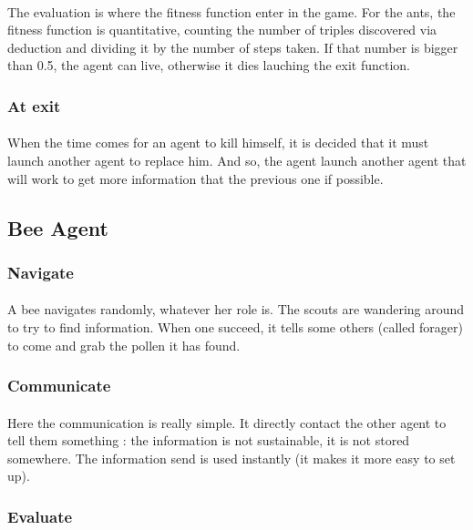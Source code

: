\documentclass{article}
\begin{document}
			\paragraph{}
			The evaluation is where the fitness function enter in the game.
			For the ants, the fitness function is quantitative,
			counting the number of triples discovered via deduction and dividing it by the number of steps taken.
			If that number is bigger than 0.5, the agent can live, otherwise it dies lauching the exit function.
		\subsubsection{At exit}
			\paragraph{}
			When the time comes for an agent to kill himself, it is decided that it must launch another agent to replace him.
			And so, the agent launch another agent that will work to get more information that the previous one if possible.
	\subsection{Bee Agent}
		\subsubsection{Navigate}
			\paragraph{}
			A bee navigates randomly, whatever her role is.
			The scouts are wandering around to try to find information.
			When one succeed, it tells some others (called forager) to come and grab the pollen it has found.
		\subsubsection{Communicate}
			\paragraph{}
			Here the communication is really simple.
			It directly contact the other agent to tell them something : the information is not sustainable, it is not stored somewhere.
			The information send is used instantly (it makes it more easy to set up).
		\subsubsection{Evaluate}
\end{document}
